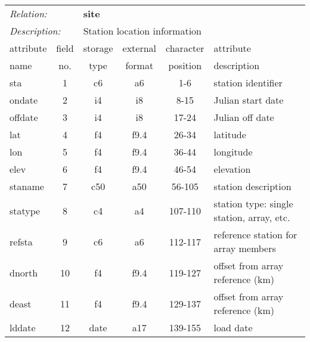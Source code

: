 \begin{center}
\begin{tabular*}{1.0\textwidth}{@{\extracolsep{\fill}}|lccccl|}  \hline
\multicolumn{2}{|l}{{\it Relation:}} & \multicolumn{4}{l|}{{\bf site}} \\
\multicolumn{2}{|l}{{\it Description:}} & \multicolumn{4}{l|}{Station location information} \\ \cline{1-6}
\multicolumn{1}{|l}{attribute \vspace{-0.07 in}} & \multicolumn{1}{c}{field} & \multicolumn{1}{c}{storage} & \multicolumn{1}{c}{external} & \multicolumn{1}{c}{character} & \multicolumn{1}{l|}{attribute} \\
\multicolumn{1}{|l}{name} &  \multicolumn{1}{c}{no.} & \multicolumn{1}{c}{type} & \multicolumn{1}{c}{format} & \multicolumn{1}{c}{position} & \multicolumn{1}{l|}{description} \\
 \hline\hline
sta     & 1  &   c6   &  a6    &    1-6   & station identifier \\
ondate  & 2  &   i4   &  i8    &    8-15  & Julian start date \\
offdate & 3  &   i4   &  i8    &   17-24  & Julian off date \\
lat     & 4  &   f4   &  f9.4  &   26-34  & latitude \\
lon     & 5  &   f4   &  f9.4  &   36-44  & longitude \\
elev    & 6  &   f4   &  f9.4  &   46-54  & elevation \\
staname & 7  &   c50  &  a50   &   56-105 & station description \\
statype & 8  &   c4   &  a4    &  107-110 & station type: single station, array, etc. \\
refsta  & 9  &   c6   &  a6    &  112-117 & reference station for array members \\
dnorth  &10  &   f4   &  f9.4  &  119-127 & offset from array reference (km) \\
deast   &11  &   f4   &  f9.4  &  129-137 & offset from array reference (km) \\
lddate  &12  &  date  &  a17   &  139-155 & load date \\ \cline{1-6}
\end{tabular*}
\end{center}
\vspace{20pt}
%
